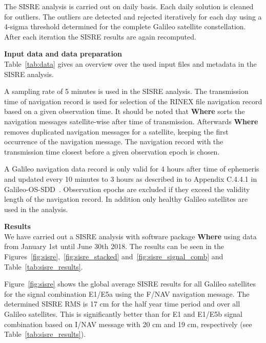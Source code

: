 The SISRE analysis is carried out on daily basis. Each daily solution is cleaned for outliers. The outliers are detected and rejected iteratively for each day using a 4-sigma threshold determined for the complete Galileo satellite constellation. After each iteration the SISRE results are again recomputed.


\columnbreak
{\large\bfseries Input data and data preparation}\\
Table~\ref{tab:data} gives an overview over the used input files and metadata in the SISRE analysis.

A sampling rate of 5 minutes is used in the SISRE analysis. %
The transmission time of navigation record is used for selection of the RINEX file navigation record based on a given observation time. It should be noted that \textbf{Where} sorts the navigation messages satellite-wise after time of transmission. Afterwards \textbf{Where} removes duplicated navigation messages for a satellite, keeping the first occurrence of the navigation message. The navigation record with the transmission time closest before a given observation epoch is chosen.

A Galileo navigation data record is only valid for 4 hours after time of ephemeris and updated every 10 minutes to 3 hours as described in to Appendix C.4.4.1 in Galileo-OS-SDD~\cite{galileo-os-sdd}. Observation epochs are excluded if they exceed the validity length of the navigation record. In addition only healthy Galileo satellites are used in the analysis. 


{\large\bfseries Results}\\
We have carried out a SISRE analysis with software package \textbf{Where} using data from January 1st until June 30th 2018. The results can be seen in the Figures~\ref{fig:sisre},~\ref{fig:sisre_stacked} and~\ref{fig:sisre_signal_comb} and Table~\ref{tab:sisre_results}.

Figure~\ref{fig:sisre} shows the global average SISRE results for all Galileo satellites for the signal combination E1/E5a using the F/NAV navigation message. The determined SISRE RMS is 17 cm for the half year time period and over all Galileo satellites. This is significantly better than for E1 and E1/E5b signal combination based on I/NAV message with 20 cm and 19 cm, respectively (see Table~\ref{tab:sisre_results}).

